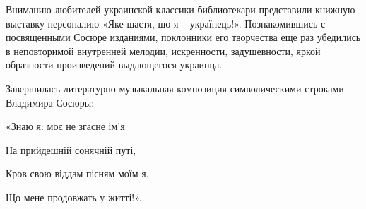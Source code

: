 Вниманию любителей украинской классики библиотекари представили книжную
выставку-персоналию «Яке щастя, що я – українець!». Познакомившись с
посвященными Сосюре изданиями, поклонники его творчества еще раз убедились в
неповторимой внутренней мелодии, искренности, задушевности, яркой образности
произведений выдающегося украинца.

Завершилась литературно-музыкальная композиция символическими строками
Владимира Сосюры: 

«Знаю я: моє не згасне ім'я

На прийдешній сонячній путі,

Кров свою віддам пісням моїм я,

Що мене продовжать у житті!».
